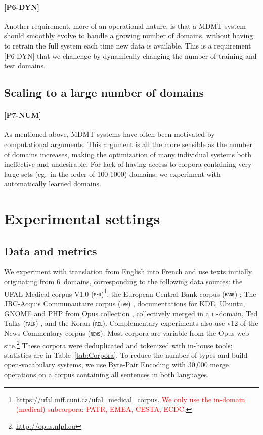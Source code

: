 \documentclass[11pt,a4paper]{article}
\newcommand{\fyDone}[1]{\done[FY]\Todo[FY:]{\textcolor{orange}{#1}}}
\newcommand{\fyFuture}[1]{\done[FY]\Todo[FY:]{\textcolor{red}{#1}}}
\newcommand{\revision}[1]{\textcolor{red}{#1}}
\newcommand{\domain}[1]{\texttt{\textsc{#1}}}
\begin{document}
\paragraph{[P6-DYN]}
Another requirement, more of an operational nature, is that a MDMT system should smoothly evolve to handle a growing number of domains, without having to retrain the full system each time new data is available. This is a requirement [P6-DYN] that we challenge by dynamically changing the number of training and test domains.

\subsection{Scaling to a large number of domains \label{ssec:scaling}}

\paragraph{[P7-NUM]} As mentioned above, MDMT systems have often been motivated by computational arguments. This argument is all the more sensible as the number of domains increases, making the optimization of many individual systems both ineffective and undesirable. For lack of having access to corpora containing very large sets (eg.\ in the order of 100-1000) domains, we experiment with automatically learned domains.\fyFuture{considering a varying number of clusters.}

\section{Experimental settings \label{sec:experiments}}

\subsection{Data and metrics \label{ssec:corpora}}

We experiment with translation from English into French and use texts initially originating from 6~domains, corresponding to the following data sources: the UFAL Medical corpus V1.0 (\domain{med})\footnote{\url{https://ufal.mff.cuni.cz/ufal_medical_corpus}. \revision{We only use the in-domain (medical) subcorpora: PATR, EMEA, CESTA, ECDC.}}, the European Central Bank corpus (\domain{bank}) \cite{Tiedemann12parallel}; The JRC-Acquis Communautaire corpus (\domain{law}) \cite{Steinberger06acquis}, documentations for KDE, Ubuntu, GNOME and PHP from Opus collection \cite{Tiedemann09news}, collectively merged in a \domain{it}-domain, Ted Talks (\domain{talk}) \cite{Cettolo12wit}, and the Koran (\domain{rel}). Complementary experiments also use v12 of the News Commentary corpus (\domain{news}). Most corpora are variable from the Opus web site.\footnote{\url{http://opus.nlpl.eu}} These corpora were deduplicated and tokenized with in-house tools; statistics are in Table~\ref{tab:Corpora}. To reduce the number of types and build open-vocabulary systems, we use Byte-Pair Encoding \cite{Sennrich16BPE} with 30,000 merge operations on a corpus containing all sentences in both languages.\fyDone{Add \# number of tokens, also specificity ?}%
\end{document}
